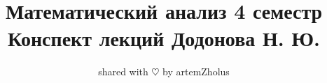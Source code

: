 \documentclass{article}
\title{%
	Математический анализ 4 семестр \\
	\large Конспект лекций Додонова Н. Ю.}
\author{shared with $\heartsuit$ by artemZholus}
\date{}
\begin{document}
\theoremstyle{definition}
\newtheorem*{definition}{Определение}
\theoremstyle{plain}
\newtheorem{theorem}{Теорема}[section]
\newtheorem{axiom}{Аксиома}
\newtheorem{lemma}[theorem]{Лемма}
\newtheorem{statement}[theorem]{Утверждение}
\newtheorem{nb}[theorem]{N. B.}
\newtheorem{corollary}[theorem]{Следствие}
\theoremstyle{remark}
\newtheorem*{example}{Пример}
\newtheorem{property}[theorem]{Свойство}


\newcommand{\todo}{\textsc{\textbf{TODO}}}
\newcommand{\abs}[1]{\left|#1\right|}
\newcommand{\norm}[1]{\left\|#1\right\|}
\newcommand{\normp}[1]{\norm{#1}_p}
\newcommand{\normpp}[2]{\norm{#1}_{#2}}
\newcommand{\intl}[1]{\int\limits_{#1}}
\newcommand{\defeq}{\mathrel{\stackrel{\makebox[0pt]{\mbox{\normalfont\tiny def}}}{=}}}
\makeatletter
\newcommand*{\rom}[1]{\expandafter\@slowromancap\romannumeral #1@}
\makeatother
\newcommand{\iintl}[1]{\iint\limits_{#1}}
\newcommand{\pdiff}[2]{\frac{\partial #1}{\partial #2}}
\newcommand{\intlr}[2]{\int\limits_{#1}^{#2}}
\newcommand{\suml}[1]{\sum\limits_{#1}}
\newcommand{\sumlr}[2]{\sum\limits_{#1}^{#2}}
\newcommand{\feps}{\forall\varepsilon}
\newcommand{\Epsilon}{\varepsilon}
\newcommand{\scalarp}[2]{\langle #1 , #2\rangle}
\newcommand{\set}[1]{\left\{#1\right\}}
\maketitle
\tableofcontents
\newpage









\end{document}
